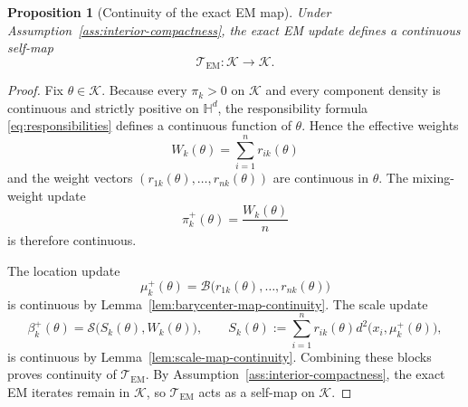 \documentclass[11pt]{article}
\newtheorem{proposition}[theorem]{Proposition}
\begin{document}
\begin{proposition}[Continuity of the exact EM map]\label{prop:em-map-continuity}
Under Assumption~\ref{ass:interior-compactness}, the exact EM update defines a continuous self-map
\[
\mathcal{T}_{\mathrm{EM}}:\mathcal{K}\to\mathcal{K}.
\]
\end{proposition}

\begin{proof}
Fix \(\theta\in\mathcal{K}\). Because every \(\pi_k>0\) on \(\mathcal{K}\) and every component density is continuous and strictly positive on \(\mathbb{H}^d\), the responsibility formula \eqref{eq:responsibilities} defines a continuous function of \(\theta\). Hence the effective weights
\[
W_k(\theta)=\sum_{i=1}^n r_{ik}(\theta)
\]
and the weight vectors \((r_{1k}(\theta),\ldots,r_{nk}(\theta))\) are continuous in \(\theta\). The mixing-weight update
\[
\pi_k^+(\theta)=\frac{W_k(\theta)}{n}
\]
is therefore continuous.

The location update
\[
\mu_k^+(\theta)
=
\mathcal{B}\bigl(r_{1k}(\theta),\ldots,r_{nk}(\theta)\bigr)
\]
is continuous by Lemma~\ref{lem:barycenter-map-continuity}. The scale update
\[
\beta_k^+(\theta)
=
\mathcal{S}\bigl(S_k(\theta),W_k(\theta)\bigr),
\qquad
S_k(\theta):=\sum_{i=1}^n r_{ik}(\theta)d^2\bigl(x_i,\mu_k^+(\theta)\bigr),
\]
is continuous by Lemma~\ref{lem:scale-map-continuity}. Combining these blocks proves continuity of \(\mathcal{T}_{\mathrm{EM}}\). By Assumption~\ref{ass:interior-compactness}, the exact EM iterates remain in \(\mathcal{K}\), so \(\mathcal{T}_{\mathrm{EM}}\) acts as a self-map on \(\mathcal{K}\).
\end{proof}
\end{document}
